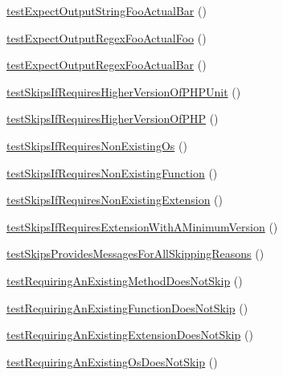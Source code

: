 \begin{DoxyCompactItemize}
\mbox{\hyperlink{class_framework___test_case_test_ae0410ef6e54644afb5cf8ca7271b4bd7}{test\+Expect\+Output\+String\+Foo\+Actual\+Bar}} ()
\item 
\mbox{\hyperlink{class_framework___test_case_test_a35a5bd5a2b6809cbe8176b7fd8092bd1}{test\+Expect\+Output\+Regex\+Foo\+Actual\+Foo}} ()
\item 
\mbox{\hyperlink{class_framework___test_case_test_a243376e2ecc8e5ed9fc0238934387bc0}{test\+Expect\+Output\+Regex\+Foo\+Actual\+Bar}} ()
\item 
\mbox{\hyperlink{class_framework___test_case_test_aefb0ff90cf8b852ae78294ba2183ebd1}{test\+Skips\+If\+Requires\+Higher\+Version\+Of\+P\+H\+P\+Unit}} ()
\item 
\mbox{\hyperlink{class_framework___test_case_test_a5c64cd379709398317baf2fad821dd80}{test\+Skips\+If\+Requires\+Higher\+Version\+Of\+P\+HP}} ()
\item 
\mbox{\hyperlink{class_framework___test_case_test_a510284000d9aa6fa4ad84f2fcbdd5194}{test\+Skips\+If\+Requires\+Non\+Existing\+Os}} ()
\item 
\mbox{\hyperlink{class_framework___test_case_test_acc517a14b11cf4492cf1ff7b2d8aadd9}{test\+Skips\+If\+Requires\+Non\+Existing\+Function}} ()
\item 
\mbox{\hyperlink{class_framework___test_case_test_a1428c59f808940d806bfa7bbc54801ef}{test\+Skips\+If\+Requires\+Non\+Existing\+Extension}} ()
\item 
\mbox{\hyperlink{class_framework___test_case_test_a5d422076b02b06169d8445f3032c45c1}{test\+Skips\+If\+Requires\+Extension\+With\+A\+Minimum\+Version}} ()
\item 
\mbox{\hyperlink{class_framework___test_case_test_acbffec669fdfdc3f6ebeed002fea5265}{test\+Skips\+Provides\+Messages\+For\+All\+Skipping\+Reasons}} ()
\item 
\mbox{\hyperlink{class_framework___test_case_test_a103a008c06a6aa5f681a50f2f68b9a58}{test\+Requiring\+An\+Existing\+Method\+Does\+Not\+Skip}} ()
\item 
\mbox{\hyperlink{class_framework___test_case_test_a34ce343fabb4172d5356258c991ffdd8}{test\+Requiring\+An\+Existing\+Function\+Does\+Not\+Skip}} ()
\item 
\mbox{\hyperlink{class_framework___test_case_test_a5ecce9b14023c7178feb925da473e62f}{test\+Requiring\+An\+Existing\+Extension\+Does\+Not\+Skip}} ()
\item 
\mbox{\hyperlink{class_framework___test_case_test_af908fac537bce9e2e936709aff31ad5a}{test\+Requiring\+An\+Existing\+Os\+Does\+Not\+Skip}} ()

\end{DoxyCompactItemize}
